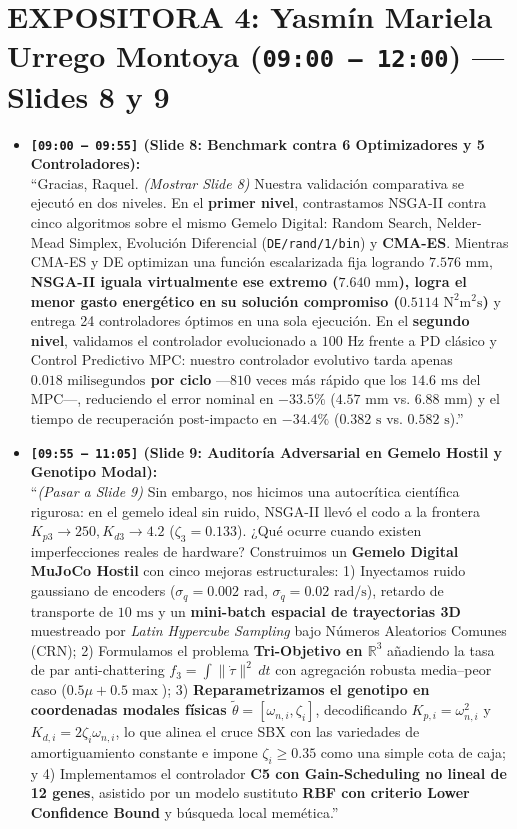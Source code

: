 \documentclass[11pt,a4paper]{article}
\begin{document}
\section*{EXPOSITORA 4: Yasmín Mariela Urrego Montoya (\texttt{09:00 -- 12:00}) — Slides 8 y 9}
\begin{itemize}
    \item \textbf{\texttt{[09:00 -- 09:55]} (Slide 8: Benchmark contra 6 Optimizadores y 5 Controladores):} \\
    ``Gracias, Raquel. \textit{(Mostrar Slide 8)} Nuestra validación comparativa se ejecutó en dos niveles. En el \textbf{primer nivel}, contrastamos NSGA-II contra cinco algoritmos sobre el mismo Gemelo Digital: Random Search, Nelder-Mead Simplex, Evolución Diferencial (\texttt{DE/rand/1/bin}) y \textbf{CMA-ES}. Mientras CMA-ES y DE optimizan una función escalarizada fija logrando $7.576\text{ mm}$, \textbf{NSGA-II iguala virtualmente ese extremo ($7.640\text{ mm}$), logra el menor gasto energético en su solución compromiso ($0.5114\text{ N}^2\text{m}^2\text{s}$)} y entrega 24 controladores óptimos en una sola ejecución. En el \textbf{segundo nivel}, validamos el controlador evolucionado a $100\text{ Hz}$ frente a PD clásico y Control Predictivo MPC: nuestro controlador evolutivo tarda apenas \textbf{$0.018\text{ milisegundos}$ por ciclo} —$810$ veces más rápido que los $14.6\text{ ms}$ del MPC—, reduciendo el error nominal en \textbf{$-33.5\%$} ($4.57\text{ mm}$ vs. $6.88\text{ mm}$) y el tiempo de recuperación post-impacto en \textbf{$-34.4\%$} ($0.382\text{ s}$ vs. $0.582\text{ s}$).''

    \item \textbf{\texttt{[09:55 -- 11:05]} (Slide 9: Auditoría Adversarial en Gemelo Hostil y Genotipo Modal):} \\
    ``\textit{(Pasar a Slide 9)} Sin embargo, nos hicimos una autocrítica científica rigurosa: en el gemelo ideal sin ruido, NSGA-II llevó el codo a la frontera $K_{p3}\to 250, K_{d3}\to 4.2$ ($\zeta_3 = 0.133$). ¿Qué ocurre cuando existen imperfecciones reales de hardware? Construimos un \textbf{Gemelo Digital MuJoCo Hostil} con cinco mejoras estructurales: 1) Inyectamos ruido gaussiano de encoders ($\sigma_q = 0.002\text{ rad}$, $\sigma_{\dot{q}} = 0.02\text{ rad/s}$), retardo de transporte de $10\text{ ms}$ y un \textbf{mini-batch espacial de trayectorias 3D} muestreado por \textit{Latin Hypercube Sampling} bajo Números Aleatorios Comunes (CRN); 2) Formulamos el problema \textbf{Tri-Objetivo en $\mathbb{R}^3$} añadiendo la tasa de par anti-chattering $f_3 = \int \|\dot{\tau}\|^2\,dt$ con agregación robusta media--peor caso ($0.5\mu + 0.5\max$); 3) \textbf{Reparametrizamos el genotipo en coordenadas modales físicas $\tilde{\theta} = [\omega_{n,i}, \zeta_i]$}, decodificando $K_{p,i} = \omega_{n,i}^2$ y $K_{d,i} = 2\zeta_i\omega_{n,i}$, lo que alinea el cruce SBX con las variedades de amortiguamiento constante e impone $\zeta_i \ge 0.35$ como una simple cota de caja; y 4) Implementamos el controlador \textbf{C5 con Gain-Scheduling no lineal de 12 genes}, asistido por un modelo sustituto \textbf{RBF con criterio Lower Confidence Bound} y búsqueda local memética.''


\end{itemize}
\end{document}

